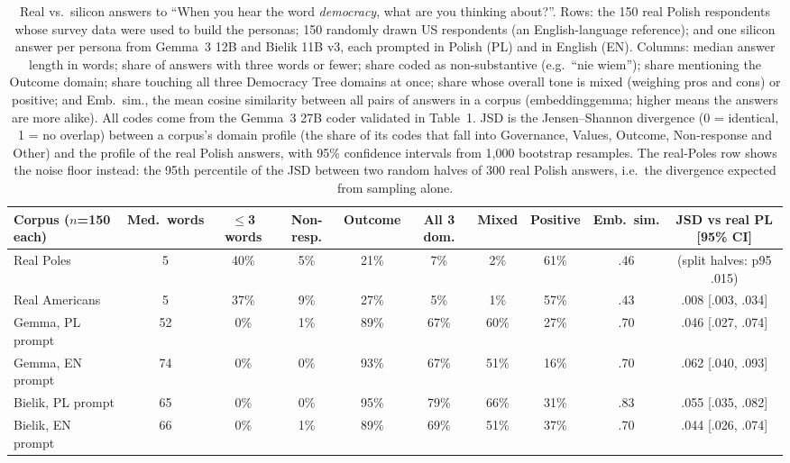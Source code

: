 \documentclass[10pt,twocolumn]{article}
\begin{document}
\begin{table}[t]\centering\small\setlength{\tabcolsep}{3.6pt}
\begin{tabular}{@{}lccccccccc@{}}\toprule
Corpus ($n$=150 each) & Med.\ words & $\le$3 words & Non-resp. & Outcome & All 3 dom. & Mixed & Positive & Emb.\ sim. & JSD vs real PL [95\% CI] \\ \midrule
Real Poles & 5 & 40\% & 5\% & 21\% & 7\% & 2\% & 61\% & .46 & (split halves: p95 .015) \\
Real Americans & 5 & 37\% & 9\% & 27\% & 5\% & 1\% & 57\% & .43 & .008 [.003, .034] \\ \midrule
Gemma, PL prompt & 52 & 0\% & 1\% & 89\% & 67\% & 60\% & 27\% & .70 & .046 [.027, .074] \\
Gemma, EN prompt & 74 & 0\% & 0\% & 93\% & 67\% & 51\% & 16\% & .70 & .062 [.040, .093] \\
Bielik, PL prompt & 65 & 0\% & 0\% & 95\% & 79\% & 66\% & 31\% & .83 & .055 [.035, .082] \\
Bielik, EN prompt & 66 & 0\% & 1\% & 89\% & 69\% & 51\% & 37\% & .70 & .044 [.026, .074] \\ \bottomrule
\end{tabular}
\caption{Real vs.\ silicon answers to ``When you hear the word \emph{democracy}, what are you thinking about?''. Rows: the 150 real Polish respondents whose survey data were used to build the personas; 150 randomly drawn US respondents (an English-language reference); and one silicon answer per persona from Gemma~3 12B and Bielik 11B v3, each prompted in Polish (PL) and in English (EN). Columns: median answer length in words; share of answers with three words or fewer; share coded as non-substantive (e.g.\ ``nie wiem''); share mentioning the Outcome domain; share touching all three Democracy Tree domains at once; share whose overall tone is mixed (weighing pros and cons) or positive; and Emb.\ sim., the mean cosine similarity between all pairs of answers in a corpus (embeddinggemma; higher means the answers are more alike). All codes come from the Gemma~3 27B coder validated in Table~1. JSD is the Jensen--Shannon divergence (0 = identical, 1 = no overlap) between a corpus's domain profile (the share of its codes that fall into Governance, Values, Outcome, Non-response and Other) and the profile of the real Polish answers, with 95\% confidence intervals from 1,000 bootstrap resamples. The real-Poles row shows the noise floor instead: the 95th percentile of the JSD between two random halves of 300 real Polish answers, i.e.\ the divergence expected from sampling alone.}
\end{table}
\end{document}
